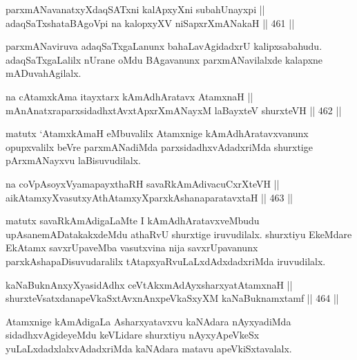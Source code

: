 

\begin{shl}
parxmANavanatxyXdaqSATxni kalApxyXni subahUnayxpi || \\
adaqSaTxshataBAgoV\s pi na kalopxyXV niSapxrXmANakaH \hfill || 461 ||  
\end{shl}

\begin{artha}
parxmANaviruva adaqSaTxgaLanunx bahaLavAgidadxrU
kalipxsabahudu. adaqSaTxgaLalilx nUrane oMdu BAgavanunx
parxmANavilalxde kalapxne mADuvahAgilalx.
\end{artha}

\begin{shl}
na cA\s \s tamxkAma itayxtarx kAmAdhAratavx AtamxnaH || \\
mAnAnatxraparxsidadhxtAvxtApxrXmANayxM laBayxteV shurxteVH \hfill || 462 ||  
\end{shl}

\begin{artha}
matutx `AtamxkAmaH eMbuvalilx Atamxnige kAmAdhAratavxvanunx
opupxvalilx beVre parxmANadiMda parxsidadhxvAdadxriMda shurxtige
pArxmANayxvu laBisuvudilalx.
\end{artha}

\begin{shl}
na coVpAsoyxV\s yamapayxthaRH savaRkAmAdivacuCxrXteVH || \\
aikAtamxyXvasutxyAthAtamxyXparxkAshanaparatavxtaH \hfill || 463 ||  
\end{shl}

\begin{artha}
matutx savaRkAmAdigaLaMte I kAmAdhAratavxveMbudu
upAsanemADatakakxdeMdu athaRvU shurxtige iruvudilalx. shurxtiyu
EkeMdare EkAtamx savxrUpaveMba vasutxvina nija savxrUpavanunx
parxkAshapaDisuvudaralilx tAtapxyaRvuLaLxdAdxdadxriMda iruvudilalx.
\end{artha}


\begin{shl}
kaNaBuknAnxyXyasidAdhx ceVtAkxmAdAyxsharxyatA\s \s tamxnaH || \\
shurxteVsatxdanapeVkaSxtAvxnAnxpeVkaSxyXM kaNaBuknamxtamf \hfill || 464 ||  
\end{shl}

\begin{artha}
Atamxnige kAmAdigaLa Asharxyatavxvu kaNAdara nAyxyadiMda
sidadhxvAgideyeMdu keVLidare shurxtiyu nAyxyApeVkeSx
yuLaLxdadxlalxvAdadxriMda kaNAdara matavu apeVkiSxtavalalx.
\end{artha}

